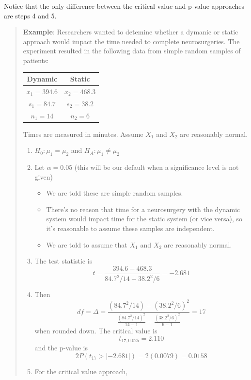 \documentclass[
]{book}
\providecommand{\tightlist}{%
  \setlength{\itemsep}{0pt}\setlength{\parskip}{0pt}}
\begin{document}
Notice that the only difference between the critical value and p-value approaches are steps 4 and 5.

\begin{quote}
\textbf{Example}: Researchers wanted to detemine whether a dymanic or static approach would impact the time needed to complete neurosurgeries. The experiment resulted in the following data from simple random samples of patients:

\begin{longtable}[]{@{}cc@{}}
\toprule\noalign{}
Dynamic & Static \\
\midrule\noalign{}
\endhead
\bottomrule\noalign{}
\endlastfoot
\(\bar{x}_1 = 394.6\) & \(\bar{x}_2 = 468.3\) \\
\(s_1 = 84.7\) & \(s_2 = 38.2\) \\
\(n_1 = 14\) & \(n_2 = 6\) \\
\end{longtable}

Times are measured in minutes. Assume \(X_1\) and \(X_2\) are reasonably normal.

\begin{enumerate}
\def\labelenumi{\arabic{enumi}.}
\tightlist
\item
  \(H_0: \mu_1 = \mu_2\) and \(H_A: \mu_1\ne\mu_2\)
\item
  Let \(\alpha=0.05\) (this will be our default when a significance level is not given)

  \begin{itemize}
  \tightlist
  \item
    We are told these are simple random samples.
  \item
    There's no reason that time for a neurosurgery with the dynamic system would impact time for the static system (or vice versa), so it's reasonable to assume these samples are independent.
  \item
    We are told to assume that \(X_1\) and \(X_2\) are reasonably normal.
  \end{itemize}
\item
  The test statistic is \[t = \frac{394.6-468.3}{84.7^2/14 + 38.2^2/6} = -2.681\]
\item
  Then \[df = \Delta = \frac{(84.7^2/14) + (38.2^2/6)^2}{\frac{(84.7^2/14)^2}{14-1} + \frac{(38.2^2/6)^2}{6-1}} = 17\] when rounded down. The critical value is \[t_{17, 0.025} = 2.110\] and the p-value is \[2P(t_{17}>|-2.681|)=2(0.0079)=0.0158\]
\item
  For the critical value approach,
\end{enumerate}
\end{quote}
\end{document}
